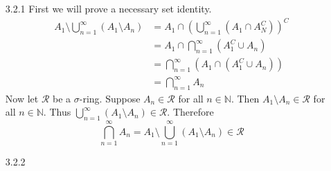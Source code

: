 \documentclass[../../Solutions.tex]{subfiles}
\begin{document}
\begin{itemize}
	\item [3.2.1] First we will prove a necessary set identity.
		\begin{equation*} \begin{split}
			A_1 \setminus \bigcup_{n=1}^\infty (A_1 \setminus A_n) & = A_1 \cap \left( \bigcup_{n=1}^\infty (A_1 \cap A_N^C) \right)^C \\
				& = A_1 \cap \bigcap_{n=1}^\infty (A_1^C \cup A_n) \\
				& = \bigcap_{n=1}^\infty (A_1 \cap (A_1^C \cup A_n)) \\
				& = \bigcap_{n=1}^\infty A_n
		\end{split} \end{equation*}
		Now let $\mathcal{R}$ be a $\sigma$-ring.
		Suppose $A_n \in \mathcal{R}$ for all $n \in \mathbb{N}$.
		Then $A_1 \setminus A_n \in \mathcal{R}$ for all $n \in \mathbb{N}$.
		Thus $\bigcup_{n=1}^\infty (A_1 \setminus A_n) \in \mathcal{R}$.
		Therefore
		$$ \bigcap_{n=1}^\infty A_n = A_1 \setminus \bigcup_{n=1}^\infty (A_1 \setminus A_n) \in \mathcal{R} $$
	
	\item [3.2.2]
	
\end{itemize}
\end{document}
